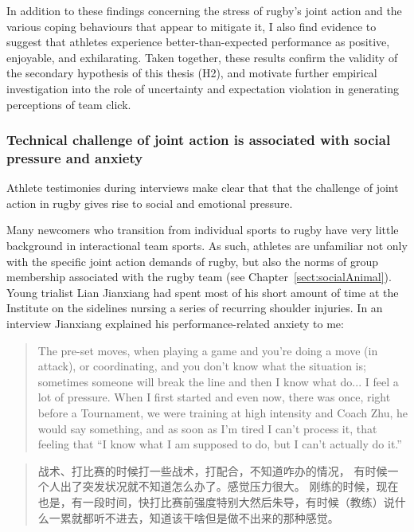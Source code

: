 \begin{CJK}{UTF8}{gbsn}
In addition to these findings concerning the stress of rugby's joint action and the various coping behaviours that appear to mitigate it, I also find evidence to suggest that athletes experience better-than-expected performance as positive, enjoyable, and exhilarating.  Taken together, these results confirm the validity of the secondary hypothesis of this thesis (H2), and motivate further empirical investigation into the role of uncertainty and expectation violation in generating perceptions of team click.


\subsubsection{Technical challenge of joint action is associated with social pressure and anxiety}

Athlete testimonies during interviews make clear that that the challenge of joint action in rugby gives rise to social and emotional pressure.

Many newcomers who transition from individual sports to rugby have very little background in interactional team sports.  As such, athletes are unfamiliar not only with the specific joint action demands of rugby, but also the norms of group membership associated with the rugby team (see Chapter~\ref{sect:socialAnimal}).  Young trialist Lian Jianxiang had spent most of his short amount of time at the Institute on the sidelines nursing a series of recurring shoulder injuries.  In an interview Jianxiang explained his performance-related anxiety to me:

    \begin{quote}
      The pre-set moves, when playing a game and you're doing a move (in attack), or coordinating, and you don't know what the situation is; sometimes someone will break the line and then I know what do... I feel a lot of pressure.  When I first started and even now, there was once, right before a Tournament, we were training at high intensity and Coach Zhu, he would say something, and as soon as I'm tired I can't process it, that feeling that ``I know what I am supposed to do, but I can't actually do it.''
    \end{quote}

    \begin{quote}
      战术、打比赛的时候打一些战术，打配合，不知道咋办的情况， 有时候一个人出了突发状况就不知道怎么办了。感觉压力很大。 刚练的时候，现在也是，有一段时间，快打比赛前强度特别大然后朱导，有时候（教练）说什么一累就都听不进去，知道该干啥但是做不出来的那种感觉。
    \end{quote}


\end{CJK}
